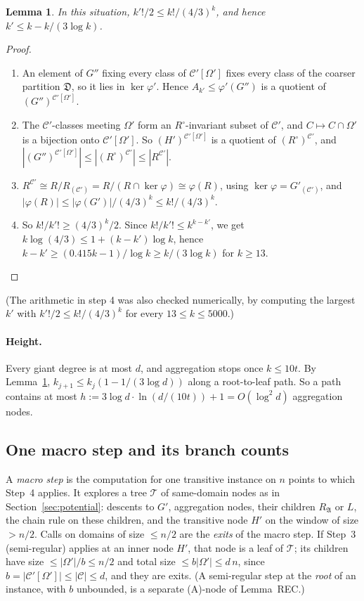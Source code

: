 \documentclass[11pt]{article}
\theoremstyle{plain}
\newtheorem{lemma}[theorem]{Lemma}
\theoremstyle{definition}
\theoremstyle{remark}
\theoremstyle{named}
\theoremstyle{namedrm}
\newcommand{\fD}{\mathfrak{D}}
\newcommand{\fA}{\mathfrak{A}}
\newcommand{\cC}{\mathcal{C}}
\newcommand{\cT}{\mathcal{T}}
\newcommand{\Cp}{\mathcal{C}'}
\begin{document}
\begin{lemma}\label{lem:potential}
In this situation, $k'!/2\le k!/(4/3)^k$, and hence $k'\le k-k/(3\log k)$.
\end{lemma}
\begin{proof}
\begin{enumerate}
\item An element of $G''$ fixing every class of $\Cp[\Omega']$ fixes every class of the coarser partition
  $\fD$, so it lies in $\ker\varphi'$. Hence $A_{k'}\le\varphi'(G'')$ is a quotient of $(G'')^{\Cp[\Omega']}$.
\item The $\Cp$-classes meeting $\Omega'$ form an $R^\circ$-invariant subset of $\Cp$, and $C\mapsto C\cap\Omega'$ is a
  bijection onto $\Cp[\Omega']$. So $(H')^{\Cp[\Omega']}$ is a quotient of $(R^\circ)^{\Cp}$, and
  $|(G'')^{\Cp[\Omega']}|\le|(R^\circ)^{\Cp}|\le|R^{\Cp}|$.
\item $R^{\Cp}\cong R/R_{(\Cp)}=R/(R\cap\ker\varphi)\cong\varphi(R)$, using $\ker\varphi=G'_{(\Cp)}$, and
  $|\varphi(R)|\le|\varphi(G')|/(4/3)^k\le k!/(4/3)^k$.
\item So $k!/k'!\ge(4/3)^k/2$. Since $k!/k'!\le k^{k-k'}$, we get $k\log(4/3)\le1+(k-k')\log k$, hence
  $k-k'\ge(0.415k-1)/\log k\ge k/(3\log k)$ for $k\ge13$.
\end{enumerate}
\end{proof}
(The arithmetic in step 4 was also checked numerically, by computing the largest $k'$ with
$k'!/2\le k!/(4/3)^k$ for every $13\le k\le5000$.)

\paragraph{Height.} Every giant degree is at most $d$, and aggregation stops once $k\le10t$. By
Lemma~\ref{lem:potential}, $k_{j+1}\le k_j(1-1/(3\log d))$ along a root-to-leaf path. So a path contains at
most $h:=3\log d\cdot\ln(d/(10t))+1=O(\log^2d)$ aggregation nodes.

\subsection{One macro step and its branch counts}

A \emph{macro step} is the computation for one transitive instance on $n$ points to which Step~4
applies. It explores a tree $\cT$ of same-domain nodes as in Section~\ref{sec:potential}: descents to
$G'$, aggregation nodes, their children $R_\fA$ or $L$, the chain rule on these children, and the transitive
node $H'$ on the window of size $>n/2$. Calls on domains of size $\le n/2$ are the \emph{exits} of the macro
step. If Step~3 (semi-regular) applies at an inner node $H'$, that node is a leaf of $\cT$; its children
have size $\le|\Omega'|/b\le n/2$ and total size $\le b|\Omega'|\le d\,n$, since $b=|\Cp[\Omega']|\le|\cC|\le d$, and
they are exits. (A semi-regular step at the \emph{root} of an instance, with $b$ unbounded, is a separate
(A)-node of Lemma~REC.)
\end{document}
